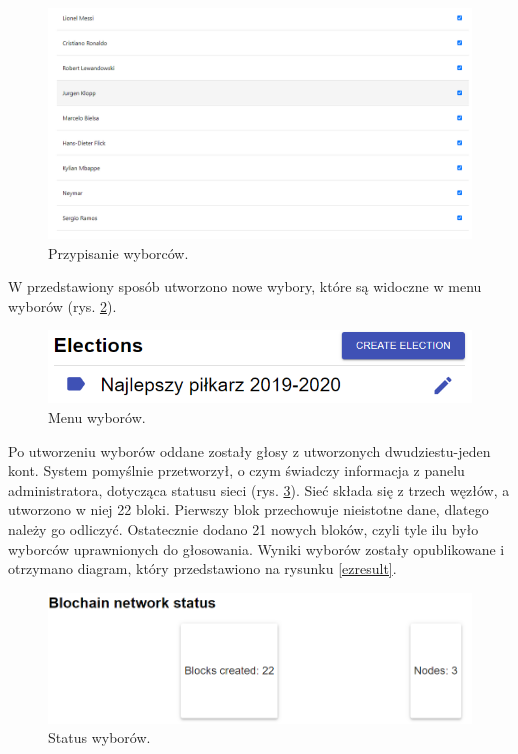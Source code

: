 \documentclass[a4paper,12pt]{book}
\begin{document}
\begin{figure}[H]
  \centering
\includegraphics[width=\textwidth]{images/choosingplayers.png}
\caption{Przypisanie wyborców.}\label{choosingplayers}
\end {figure}

W przedstawiony sposób utworzono nowe wybory, które są widoczne w menu wyborów (rys. \ref{addedelectionstest}).

\begin{figure}[H]
  \centering
\includegraphics[width=\textwidth]{images/addedelectionstest.png}
\caption{Menu wyborów.}\label{addedelectionstest}
\end {figure}

Po utworzeniu wyborów oddane zostały głosy z utworzonych dwudziestu-jeden kont. System pomyślnie przetworzył, o czym świadczy informacja z panelu administratora, dotycząca statusu sieci (rys. \ref{bcstatus2}).
Sieć składa się z trzech węzłów, a utworzono w niej 22 bloki. Pierwszy blok przechowuje nieistotne dane, dlatego należy go odliczyć.
Ostatecznie dodano 21 nowych bloków, czyli tyle ilu było wyborców uprawnionych do głosowania. Wyniki wyborów zostały opublikowane i otrzymano diagram, który przedstawiono na rysunku \ref{ezresult}.

\begin{figure}[H]
  \centering
\includegraphics[width=\textwidth]{images/bcstatus2.png}
\caption{Status wyborów.}\label{bcstatus2}
\end {figure}
\end{document}
